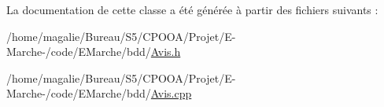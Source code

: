 La documentation de cette classe a été générée à partir des fichiers suivants \-:\begin{DoxyCompactItemize}
\item 
/home/magalie/\-Bureau/\-S5/\-C\-P\-O\-O\-A/\-Projet/\-E-\/\-Marche-\//code/\-E\-Marche/bdd/\hyperlink{_avis_8h}{Avis.\-h}\item 
/home/magalie/\-Bureau/\-S5/\-C\-P\-O\-O\-A/\-Projet/\-E-\/\-Marche-\//code/\-E\-Marche/bdd/\hyperlink{_avis_8cpp}{Avis.\-cpp}\end{DoxyCompactItemize}
